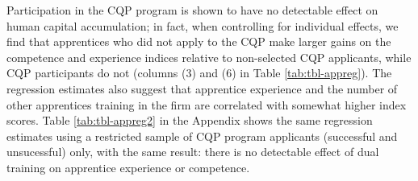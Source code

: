 \documentclass[
  11pt,
a4paper
]{article}
\begin{document}
Participation in the CQP program is shown to have no detectable effect on human capital accumulation; in fact, when controlling for individual effects, we find that apprentices who did not apply to the CQP make larger gains on the competence and experience indices relative to non-selected CQP applicants, while CQP participants do not (columns (3) and (6) in Table \ref{tab:tbl-appreg}). The regression estimates also suggest that apprentice experience and the number of other apprentices training in the firm are correlated with somewhat higher index scores. Table \ref{tab:tbl-appreg2} in the Appendix shows the same regression estimates using a restricted sample of CQP program applicants (successful and unsucessful) only, with the same result: there is no detectable effect of dual training on apprentice experience or competence.
\end{document}
